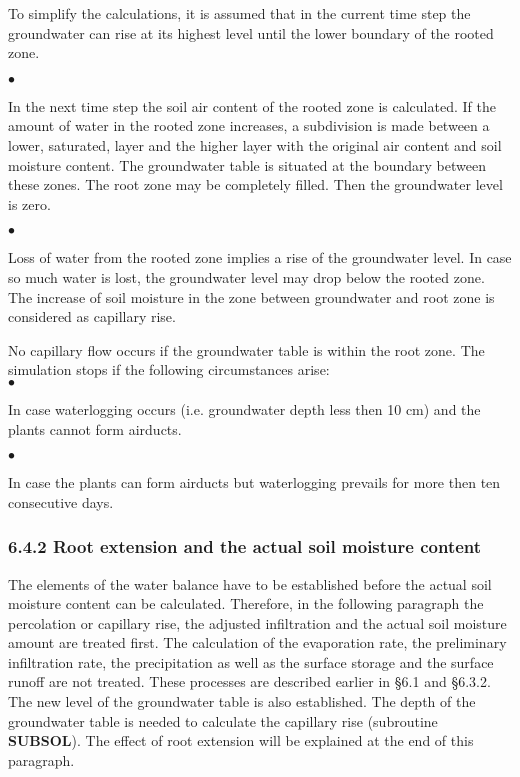 \documentclass[11pt]{article}
\begin{document}
\begin{indenting}{1.27cm}
To simplify the calculations, it is assumed that in the current time step the
groundwater can rise at its highest level until the lower boundary of the rooted
zone.
\end{indenting}
$\bullet$
\testlastline

\begin{indenting}{1.27cm}
In the next time step the soil air content of the rooted zone is calculated. If the
amount of water in the rooted zone increases, a subdivision is made between a
lower, saturated, layer and the higher layer with the original air content and soil
moisture content. The {\nobreak}groundwater table is situated at the boundary between these
zones. The root zone may be completely filled. Then the groundwater level is
zero.
\end{indenting}
$\bullet$ 
\testlastline

\begin{indenting}{1.27cm}
Loss of water from the rooted zone implies a rise of the groundwater level. In
case so much water is lost, the groundwater level may drop below the rooted
zone. The increase of soil moisture in the zone between groundwater and root
zone is considered as capillary rise.
\end{indenting}

 \bigskip
No capillary flow occurs if the groundwater table is within the root zone. The simulation
stops if the following circumstances arise:\\
$\bullet$
\testlastline

\begin{indenting}{1.27cm}
In case waterlogging occurs (i.e. groundwater depth less then 10 cm) and the
plants cannot form airducts.
\end{indenting}
$\bullet$
\testlastline

\begin{indenting}{1.27cm}
In case the plants can form airducts but waterlogging prevails for more then ten
consecutive days.
\end{indenting}

\bigskip

\subsubsection{  6.4.2 Root extension and the actual soil moisture content  }

The elements of the water balance have to be established before the actual soil moisture
content can be calculated. Therefore, in the following paragraph the percolation or
capillary rise, the adjusted infiltration and the actual soil moisture amount are treated
first. The calculation of the evaporation rate, the preliminary infiltration rate, the
precipitation as well as the surface storage and the surface runoff are not treated. These
processes are described earlier in \S 6.1 and \S 6.3.2. The new level of the groundwater
table is also established. The depth of the groundwater table is needed to calculate the
capillary rise (subroutine {\bf SUBSOL}). The effect of root extension will be explained at the
end of this paragraph.
\end{document}
